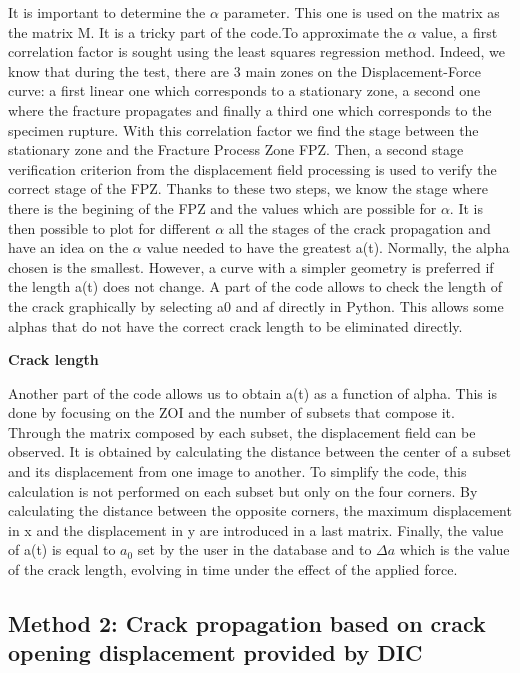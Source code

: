 It is important to determine the $\alpha$ parameter. This one is used on the matrix as the matrix M. It is a tricky part of the code.To approximate the $\alpha$ value, a first correlation factor is sought using the least squares regression method. Indeed, we know that during the test, there are 3 main zones on the Displacement-Force curve: a first linear one which corresponds to a stationary zone, a second one where the fracture propagates and finally a third one which corresponds to the specimen rupture. With this correlation factor we find the stage between the stationary zone and the Fracture Process Zone FPZ. Then, a second stage verification criterion from the displacement field processing is used to verify the correct stage of the FPZ.
Thanks to these two steps, we know the stage where there is the begining of the FPZ and the values which are possible for $\alpha$.
It is then possible to plot for different $\alpha$ all the stages of the crack propagation and have an idea on the $\alpha$ value needed to have the greatest a(t). Normally, the alpha chosen is the smallest. However, a curve with a simpler geometry is preferred if the length a(t) does not change.
A part of the code allows to check the length of the crack graphically by selecting a0 and af directly in Python. This allows some alphas that do not have the correct crack length to be eliminated directly.

\textbf{Crack length}

Another part of the code allows us to obtain a(t) as a function of alpha. This is done by focusing on the ZOI and the number of subsets that compose it. Through the matrix composed by each subset, the displacement field can be observed. It is obtained by calculating the distance between the center of a subset and its displacement from one image to another. To simplify the code, this calculation is not performed on each subset but only on the four corners. By calculating the distance between the opposite corners, the maximum displacement in x and the displacement in y are introduced in a last matrix. Finally, the value of a(t) is equal to $a_0$ set by the user in the database and to $\Delta a$ which is the value of the crack length, evolving in time under the effect of the applied force.

\subsection{Method 2: Crack propagation based on crack opening displacement provided by DIC}

